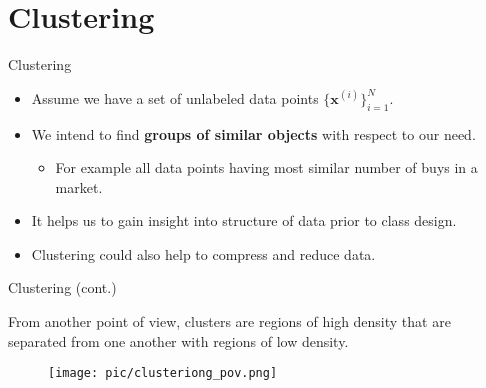 \documentclass[serif, aspectratio=169]{beamer}
\begin{document}
\section{Clustering}

\begin{frame}{Clustering}
    \begin{minipage}{0.95\textwidth}
        \begin{itemize}
        \item Assume we have a set of unlabeled data points $ \{ \mathbf{x}^{(i)} \}_{i=1}^N$.
        \item We intend to find \textbf{groups of similar objects} with respect to our need.
        \begin{itemize}
            \item For example all data points having most similar number of buys in a market.
        \end{itemize}
        \item It helps us to gain insight into structure of data prior to class design.
        \item Clustering could also help to compress and reduce data.
    \end{itemize}
    \end{minipage}%
\end{frame}

\begin{frame}{Clustering (cont.)}
    \begin{minipage}{0.55\textwidth}
        From another point of view, clusters are regions of high density that are separated from one another with regions of low density.
    \end{minipage}%
    \begin{minipage}{0.4\textwidth}
        \begin{figure}
            \centering
            \texttt{[image: pic/clusteriong\_pov.png]}
        \end{figure}
    \end{minipage}
\end{frame}
\end{document}

